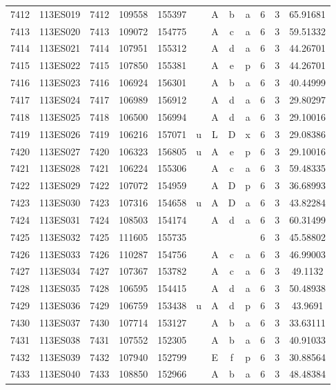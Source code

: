 \begin{tabular}{|*{12}{c|}}
7412 & 113ES019 & 7412 & 109558 & 155397 &  & A & b & a & 6 & 3 & 65.91681 \\ 
7413 & 113ES020 & 7413 & 109072 & 154775 &  & A & c & a & 6 & 3 & 59.51332 \\ 
7414 & 113ES021 & 7414 & 107951 & 155312 &  & A & d & a & 6 & 3 & 44.26701 \\ 
7415 & 113ES022 & 7415 & 107850 & 155381 &  & A & e & p & 6 & 3 & 44.26701 \\ 
7416 & 113ES023 & 7416 & 106924 & 156301 &  & A & b & a & 6 & 3 & 40.44999 \\ 
7417 & 113ES024 & 7417 & 106989 & 156912 &  & A & d & a & 6 & 3 & 29.80297 \\ 
7418 & 113ES025 & 7418 & 106500 & 156994 &  & A & d & a & 6 & 3 & 29.10016 \\ 
7419 & 113ES026 & 7419 & 106216 & 157071 & u & L & D & x & 6 & 3 & 29.08386 \\ 
7420 & 113ES027 & 7420 & 106323 & 156805 & u & A & e & p & 6 & 3 & 29.10016 \\ 
7421 & 113ES028 & 7421 & 106224 & 155306 &  & A & c & a & 6 & 3 & 59.48335 \\ 
7422 & 113ES029 & 7422 & 107072 & 154959 &  & A & D & p & 6 & 3 & 36.68993 \\ 
7423 & 113ES030 & 7423 & 107316 & 154658 & u & A & D & a & 6 & 3 & 43.82284 \\ 
7424 & 113ES031 & 7424 & 108503 & 154174 &  & A & d & a & 6 & 3 & 60.31499 \\ 
7425 & 113ES032 & 7425 & 111605 & 155735 &  &  &  &  & 6 & 3 & 45.58802 \\ 
7426 & 113ES033 & 7426 & 110287 & 154756 &  & A & c & a & 6 & 3 & 46.99003 \\ 
7427 & 113ES034 & 7427 & 107367 & 153782 &  & A & c & a & 6 & 3 & 49.1132 \\ 
7428 & 113ES035 & 7428 & 106595 & 154415 &  & A & d & a & 6 & 3 & 50.48938 \\ 
7429 & 113ES036 & 7429 & 106759 & 153438 & u & A & d & p & 6 & 3 & 43.9691 \\ 
7430 & 113ES037 & 7430 & 107714 & 153127 &  & A & b & a & 6 & 3 & 33.63111 \\ 
7431 & 113ES038 & 7431 & 107552 & 152305 &  & A & b & a & 6 & 3 & 40.91033 \\ 
7432 & 113ES039 & 7432 & 107940 & 152799 &  & E & f & p & 6 & 3 & 30.88564 \\ 
7433 & 113ES040 & 7433 & 108850 & 152966 &  & A & b & a & 6 & 3 & 48.48384 \\ 

\end{tabular}
